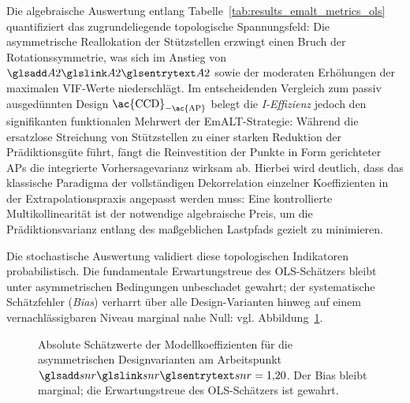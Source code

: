 Die algebraische Auswertung entlang Tabelle~\ref{tab:results_emalt_metrics_ols} quantifiziert das zugrundeliegende topologische Spannungsfeld:
Die asymmetrische Reallokation der Stützstellen erzwingt einen Bruch der Rotationssymmetrie, was sich im Anstieg von $\sym{A2}$ sowie der moderaten Erhöhungen der maximalen \ac{VIF}-Werte niederschlägt.
Im entscheidenden Vergleich zum passiv ausgedünnten Design $\textnormal{\ac{CCD}}_{-\textnormal{\ac{AP}}}$ belegt die \textit{I-Effizienz} jedoch den signifikanten funktionalen Mehrwert der \ac{EmALT}-Strategie:
Während die ersatzlose Streichung von Stützstellen zu einer starken Reduktion der Prädiktionsgüte führt, fängt die Reinvestition der Punkte in Form gerichteter \acp{AP} die integrierte Vorhersagevarianz wirksam ab.
Hierbei wird deutlich, dass das klassische Paradigma der vollständigen Dekorrelation einzelner Koeffizienten in der Extrapolationspraxis angepasst werden muss: Eine kontrollierte Multikollinearität ist der notwendige algebraische Preis, um die Prädiktionsvarianz entlang des maßgeblichen Lastpfads gezielt zu minimieren.

Die stochastische Auswertung validiert diese topologischen Indikatoren probabilistisch.
Die fundamentale Erwartungstreue des \ac{OLS}-Schätzers bleibt unter asymmetrischen Bedingungen unbeschadet gewahrt; der systematische Schätzfehler (\textit{Bias}) verharrt über alle Design-Varianten hinweg auf einem vernachlässigbaren Niveau marginal nahe Null: vgl. Abbildung~\ref{fig:ma_abb5.4.2_betadev_ols}.

\begin{figure}[htbp]
    \centering
    \setlength{}
    \setlength\figureheight{6cm}
    
    \caption{Absolute Schätzwerte der Modellkoeffizienten für die asymmetrischen Designvarianten am Arbeitspunkt $\sym{snr}=1{,}20$. Der Bias bleibt marginal; die Erwartungstreue des \ac{OLS}-Schätzers ist gewahrt.}
    \label{fig:ma_abb5.4.2_betadev_ols}
\end{figure}

